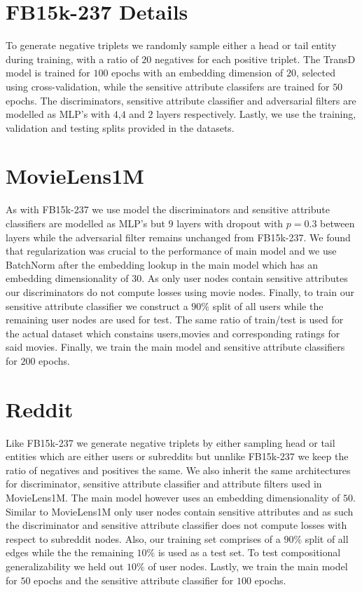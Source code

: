 \documentclass{article}
\begin{document}
\section{FB15k-237 Details}
To generate negative triplets we randomly sample either a head or tail entity during training, with a ratio of $20$ negatives for each positive triplet. The TransD model is trained for $100$ epochs with an embedding dimension of $20$, selected using cross-validation, while the sensitive attribute classifers are trained for $50$ epochs. The discriminators, sensitive attribute classifier and adversarial filters are modelled as MLP's with $4$,$4$ and $2$ layers respectively. Lastly, we use the training, validation and testing splits provided in the datasets.

\section{MovieLens1M}
As with FB15k-237 we use model the discriminators and sensitive attribute classifiers are modelled as MLP's but $9$ layers with dropout with $p=0.3$ between layers while the adversarial filter remains unchanged from FB15k-237. We found that regularization was crucial to the performance of main model and we use BatchNorm after the embedding lookup in the main model which has an embedding dimensionality of $30$. As only user nodes contain sensitive attributes our discriminators do not compute losses using movie nodes. Finally, to train our sensitive attribute classifier we construct a $90\%$ split of all users while the remaining user nodes are used for test. The same ratio of train/test is used for the actual dataset which constains users,movies and corresponding ratings for said movies. Finally, we train the main model and sensitive attribute classifiers for $200$ epochs.

\section{Reddit}
Like FB15k-237 we generate negative triplets by either sampling head or tail entities which are either users or subreddits but unnlike FB15k-237 we keep the ratio of negatives and positives the same. We also inherit the same architectures for discriminator, sensitive attribute classifier and attribute filters used in MovieLens1M. The main model however uses an embedding dimensionality of $50$. Similar to MovieLens1M only user nodes contain sensitive attributes and as such the discriminator and sensitive attribute classifier does not compute losses with respect to subreddit nodes. Also, our training set comprises of a $90\%$ split of all edges while the the remaining $10\%$ is used as a test set. To test compositional generalizability we held out $10\%$ of user nodes. Lastly, we train the main model for $50$ epochs and the sensitive attribute classifier for $100$ epochs.
\end{document}
